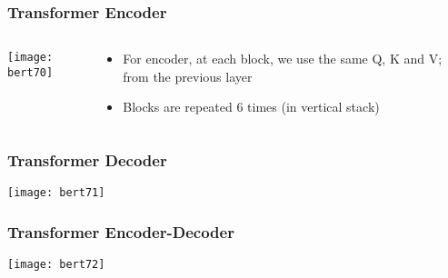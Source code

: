 \begin{frame}[fragile]\frametitle{Transformer Encoder}

\begin{columns}
    \begin{column}[T]{0.5\linewidth}
			\begin{center}
			\texttt{[image: bert70]}
			\end{center}		
		\end{column}
    \begin{column}[T]{0.5\linewidth}
      \begin{itemize}
			\item For encoder, at each block, we use the same Q, K and V; from the previous layer
			\item Blocks are repeated 6 times (in vertical stack)
			\end{itemize}
    \end{column}
  \end{columns}
			
\end{frame}

\begin{frame}[fragile]\frametitle{Transformer Decoder}


			\begin{center}
			\texttt{[image: bert71]}
			\end{center}		

			
\end{frame}

\begin{frame}[fragile]\frametitle{Transformer Encoder-Decoder}

			\begin{center}
			\texttt{[image: bert72]}
			\end{center}		

			
\end{frame}

